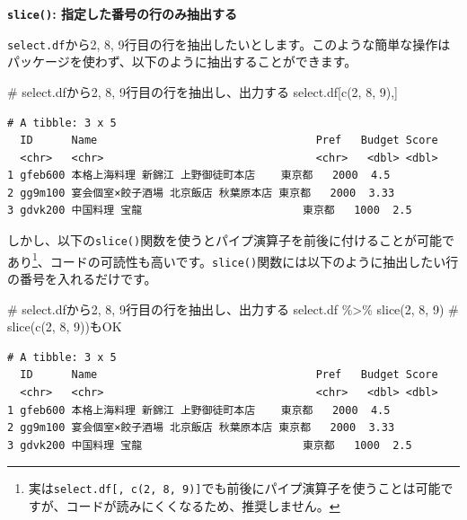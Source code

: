 \documentclass[
  a4paper,
  pandoc,
  ja=standard,
  jafont=haranoaji]{bxjsbook}
\newenvironment{Shaded}{\begin{snugshade}}{\end{snugshade}}
\newcommand{\CommentTok}[1]{\textcolor[rgb]{0.37,0.37,0.37}{#1}}
\newcommand{\DecValTok}[1]{\textcolor[rgb]{0.68,0.00,0.00}{#1}}
\newcommand{\FunctionTok}[1]{\textcolor[rgb]{0.28,0.35,0.67}{#1}}
\newcommand{\NormalTok}[1]{\textcolor[rgb]{0.00,0.48,0.65}{#1}}
\newcommand{\SpecialCharTok}[1]{\textcolor[rgb]{0.37,0.37,0.37}{#1}}
\begin{document}
\textbf{\texttt{slice()}: 指定した番号の行のみ抽出する}

\texttt{select.df}から2, 8,
9行目の行を抽出したいとします。このような簡単な操作はパッケージを使わず、以下のように抽出することができます。

\begin{Shaded}
\begin{Highlighting}[numbers=left,,]
\CommentTok{\# select.dfから2, 8, 9行目の行を抽出し、出力する}
\NormalTok{select.df[}\FunctionTok{c}\NormalTok{(}\DecValTok{2}\NormalTok{, }\DecValTok{8}\NormalTok{, }\DecValTok{9}\NormalTok{),]}
\end{Highlighting}
\end{Shaded}

\begin{verbatim}
# A tibble: 3 x 5
  ID      Name                                  Pref   Budget Score
  <chr>   <chr>                                 <chr>   <dbl> <dbl>
1 gfeb600 本格上海料理 新錦江 上野御徒町本店    東京都   2000  4.5 
2 gg9m100 宴会個室×餃子酒場 北京飯店 秋葉原本店 東京都   2000  3.33
3 gdvk200 中国料理 宝龍                         東京都   1000  2.5 
\end{verbatim}

しかし、以下の\texttt{slice()}関数を使うとパイプ演算子を前後に付けることが可能であり\footnote{実は\texttt{select.df{[},\ c(2,\ 8,\ 9){]}}でも前後にパイプ演算子を使うことは可能ですが、コードが読みにくくなるため、推奨しません。}、コードの可読性も高いです。\texttt{slice()}関数には以下のように抽出したい行の番号を入れるだけです。

\begin{Shaded}
\begin{Highlighting}[numbers=left,,]
\CommentTok{\# select.dfから2, 8, 9行目の行を抽出し、出力する}
\NormalTok{select.df }\SpecialCharTok{\%\textgreater{}\%} 
  \FunctionTok{slice}\NormalTok{(}\DecValTok{2}\NormalTok{, }\DecValTok{8}\NormalTok{, }\DecValTok{9}\NormalTok{) }\CommentTok{\# slice(c(2, 8, 9))もOK}
\end{Highlighting}
\end{Shaded}

\begin{verbatim}
# A tibble: 3 x 5
  ID      Name                                  Pref   Budget Score
  <chr>   <chr>                                 <chr>   <dbl> <dbl>
1 gfeb600 本格上海料理 新錦江 上野御徒町本店    東京都   2000  4.5 
2 gg9m100 宴会個室×餃子酒場 北京飯店 秋葉原本店 東京都   2000  3.33
3 gdvk200 中国料理 宝龍                         東京都   1000  2.5 
\end{verbatim}
\end{document}
